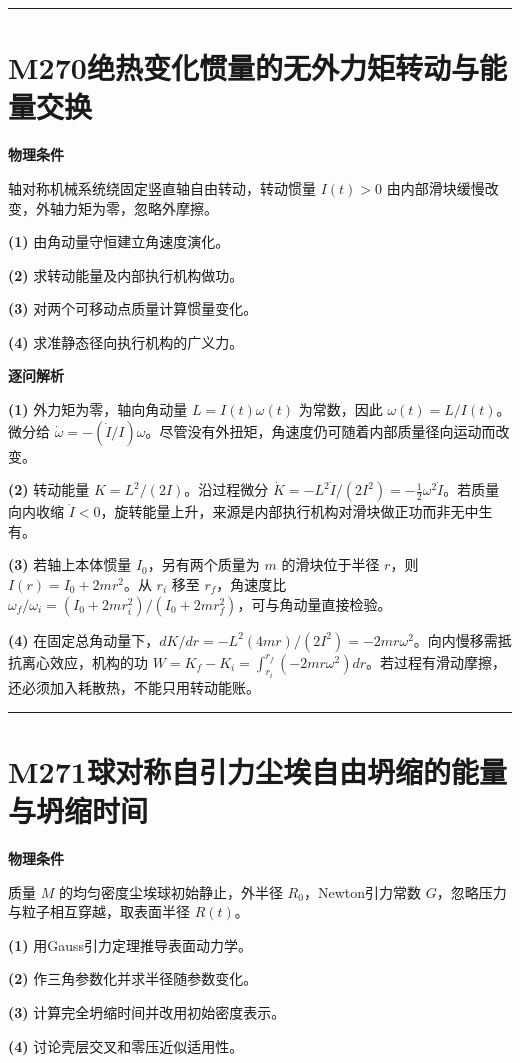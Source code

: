 \documentclass[UTF8,a4paper,11pt,oneside,openany]{ctexbook}
\begin{document}
\par\bigskip\hrule\bigskip
\section*{M270\quad 绝热变化惯量的无外力矩转动与能量交换}
\textbf{物理条件}\par 轴对称机械系统绕固定竖直轴自由转动，转动惯量 \(I(t)>0\) 由内部滑块缓慢改变，外轴力矩为零，忽略外摩擦。
\par\noindent\textbf{(1)} 由角动量守恒建立角速度演化。
\par\noindent\textbf{(2)} 求转动能量及内部执行机构做功。
\par\noindent\textbf{(3)} 对两个可移动点质量计算惯量变化。
\par\noindent\textbf{(4)} 求准静态径向执行机构的广义力。

\par\medskip\noindent\textbf{逐问解析}
\par\noindent\textbf{(1)} 外力矩为零，轴向角动量 \(L=I(t)\omega(t)\) 为常数，因此 \(\omega(t)=L/I(t)\)。微分给 \(\dot\omega=-(\dot I/I)\omega\)。尽管没有外扭矩，角速度仍可随着内部质量径向运动而改变。
\par\noindent\textbf{(2)} 转动能量 \(K=L^2/(2I)\)。沿过程微分 \(\dot K=-L^2\dot I/(2I^2)=-\tfrac12\omega^2\dot I\)。若质量向内收缩 \(\dot I<0\)，旋转能量上升，来源是内部执行机构对滑块做正功而非无中生有。
\par\noindent\textbf{(3)} 若轴上本体惯量 \(I_0\)，另有两个质量为 \(m\) 的滑块位于半径 \(r\)，则 \(I(r)=I_0+2mr^2\)。从 \(r_i\) 移至 \(r_f\)，角速度比 \(\omega_f/\omega_i=(I_0+2mr_i^2)/(I_0+2mr_f^2)\)，可与角动量直接检验。
\par\noindent\textbf{(4)} 在固定总角动量下，\(dK/dr=-L^2(4mr)/(2I^2)=-2mr\omega^2\)。向内慢移需抵抗离心效应，机构的功 \(W=K_f-K_i=\int_{r_i}^{r_f}(-2mr\omega^2)dr\)。若过程有滑动摩擦，还必须加入耗散热，不能只用转动能账。

\par\bigskip\hrule\bigskip
\section*{M271\quad 球对称自引力尘埃自由坍缩的能量与坍缩时间}
\textbf{物理条件}\par 质量 \(M\) 的均匀密度尘埃球初始静止，外半径 \(R_0\)，Newton引力常数 \(G\)，忽略压力与粒子相互穿越，取表面半径 \(R(t)\)。
\par\noindent\textbf{(1)} 用Gauss引力定理推导表面动力学。
\par\noindent\textbf{(2)} 作三角参数化并求半径随参数变化。
\par\noindent\textbf{(3)} 计算完全坍缩时间并改用初始密度表示。
\par\noindent\textbf{(4)} 讨论壳层交叉和零压近似适用性。
\end{document}
